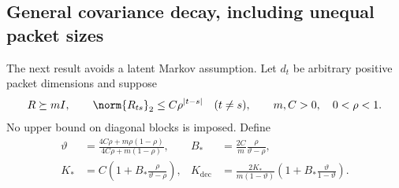 \subsection{General covariance decay, including unequal packet sizes}
\label{subsec:general-decay}
The next result avoids a latent Markov assumption. Let $d_t$ be arbitrary
positive packet dimensions and suppose
\begin{equation}
 R\succeq mI,\qquad \norm{R_{ts}}_2\le C\rho^{|t-s|}\quad(t\ne s),
 \qquad m,C>0,\quad 0<\rho<1.
 \label{eq:decay-promises}
\end{equation}
No upper bound on diagonal blocks is imposed. Define
\begin{align}
 \vartheta&=\frac{4C\rho+m\rho(1-\rho)}{4C\rho+m(1-\rho)},&
 B_*&=\frac{2C}{m}\frac{\rho}{\vartheta-\rho},\nonumber\\
 K_*&=C\left(1+B_*\frac{\rho}{\vartheta-\rho}\right),&
 K_{\mathrm{dec}}&=\frac{2K_*}{m(1-\vartheta)}
            \left(1+B_*\frac{\vartheta}{1-\vartheta}\right).
 \label{eq:decay-constants}
\end{align}


